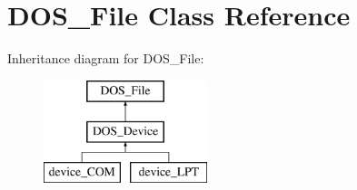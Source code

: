 \hypertarget{classDOS__File}{\section{D\-O\-S\-\_\-\-File Class Reference}
\label{classDOS__File}
}
Inheritance diagram for D\-O\-S\-\_\-\-File\-:\begin{figure}[H]
\begin{center}
\leavevmode
\includegraphics[height=3.000000cm]{classDOS__File}
\end{center}
\end{figure}
